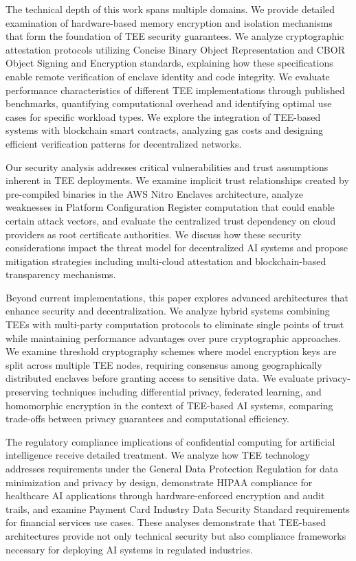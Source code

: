 The technical depth of this work spans multiple domains. We provide detailed examination of hardware-based memory encryption and isolation mechanisms that form the foundation of TEE security guarantees. We analyze cryptographic attestation protocols utilizing Concise Binary Object Representation and CBOR Object Signing and Encryption standards, explaining how these specifications enable remote verification of enclave identity and code integrity. We evaluate performance characteristics of different TEE implementations through published benchmarks, quantifying computational overhead and identifying optimal use cases for specific workload types. We explore the integration of TEE-based systems with blockchain smart contracts, analyzing gas costs and designing efficient verification patterns for decentralized networks.

Our security analysis addresses critical vulnerabilities and trust assumptions inherent in TEE deployments. We examine implicit trust relationships created by pre-compiled binaries in the AWS Nitro Enclaves architecture, analyze weaknesses in Platform Configuration Register computation that could enable certain attack vectors, and evaluate the centralized trust dependency on cloud providers as root certificate authorities. We discuss how these security considerations impact the threat model for decentralized AI systems and propose mitigation strategies including multi-cloud attestation and blockchain-based transparency mechanisms.

Beyond current implementations, this paper explores advanced architectures that enhance security and decentralization. We analyze hybrid systems combining TEEs with multi-party computation protocols to eliminate single points of trust while maintaining performance advantages over pure cryptographic approaches. We examine threshold cryptography schemes where model encryption keys are split across multiple TEE nodes, requiring consensus among geographically distributed enclaves before granting access to sensitive data. We evaluate privacy-preserving techniques including differential privacy, federated learning, and homomorphic encryption in the context of TEE-based AI systems, comparing trade-offs between privacy guarantees and computational efficiency.

The regulatory compliance implications of confidential computing for artificial intelligence receive detailed treatment. We analyze how TEE technology addresses requirements under the General Data Protection Regulation for data minimization and privacy by design, demonstrate HIPAA compliance for healthcare AI applications through hardware-enforced encryption and audit trails, and examine Payment Card Industry Data Security Standard requirements for financial services use cases. These analyses demonstrate that TEE-based architectures provide not only technical security but also compliance frameworks necessary for deploying AI systems in regulated industries.

